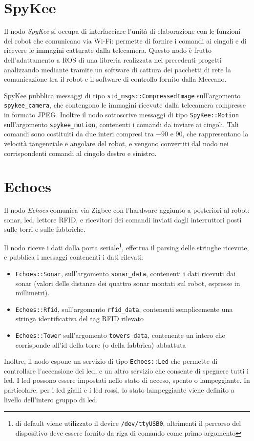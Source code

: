 \section{SpyKee}
Il nodo \emph{SpyKee} si occupa di interfacciare l'unità di elaborazione con le funzioni del robot che comunicano via Wi-Fi: permette di fornire i comandi ai cingoli e di ricevere le immagini catturate dalla telecamera. Questo nodo è frutto dell'adattamento a ROS di una libreria realizzata nei precedenti progetti analizzando mediante tramite un software di cattura dei pacchetti di rete la comunicazione tra il robot e il software di controllo fornito dalla Meccano.

SpyKee pubblica messaggi di tipo \verb|std_msgs::CompressedImage| sull'argomento \verb|spykee_camera|, che contengono le immagini ricevute dalla telecamera compresse in formato JPEG. Inoltre il nodo sottoscrive messaggi di tipo \verb|SpyKee::Motion| sull'argomento \verb|spykee_motion|, contenenti i comandi da inviare ai cingoli. Tali comandi sono costituiti da due interi compresi tra $-90$ e $90$, che rappresentano la velocità tangenziale e angolare del robot, e vengono convertiti dal nodo nei corrispondenti comandi al cingolo destro e sinistro.

\section{Echoes}
Il nodo \emph{Echoes} comunica via Zigbee con l'hardware aggiunto a posteriori al robot: sonar, led, lettore RFID, e ricevitori dei comandi inviati dagli interruttori posti sulle torri e sulle fabbriche.

Il nodo riceve i dati dalla porta seriale\footnote{di default viene utilizzato il device \texttt{/dev/ttyUSB0}, altrimenti il percorso del dispositivo deve essere fornito da riga di comando come primo argomento}, effettua il parsing delle stringhe ricevute, e pubblica i messaggi contenenti i dati rilevati:
\begin{itemize}
	\item \verb|Echoes::Sonar|, sull'argomento \verb|sonar_data|, contenenti i dati ricevuti dai sonar (valori delle distanze dei quattro sonar montati sul robot, espresse in millimetri).
	\item \verb|Echoes::Rfid|, sull'argomento \verb|rfid_data|, contenenti semplicemente una stringa identificativa del tag RFID rilevato
	\item \verb|Echoes::Tower| sull'argomento \verb|towers_data|, contenente un intero che corrisponde all'id della torre (o della fabbrica) abbattuta
\end{itemize}
Inoltre, il nodo espone un servizio di tipo \verb|Echoes::Led| che permette di controllare l'accensione dei led, e un altro servizio che consente di spegnere tutti i led. I led possono essere impostati nello stato di acceso, spento o lampeggiante. In particolare, per i led gialli e i led rossi, lo stato lampeggiante viene definito a livello dell'intero gruppo di led.

